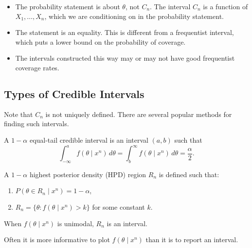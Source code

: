 \begin{itemize}
    \item The probability statement is about $\theta$, not $C_n$. The interval
    $C_n$ is a function of $X_1, \dots, X_n$, which we are conditioning on in
    the probability statement.
    \item The statement is an equality. This is different from a frequentist
    interval, which puts a lower bound on the probability of coverage.
    \item The intervals constructed this way may or may not have good
    frequentist coverage rates.
\end{itemize}


\subsection{Types of Credible Intervals}

Note that $C_n$ is not uniquely defined. There are several popular methods for
finding such intervals.

A $1-\alpha$ equal-tail credible interval is an interval $(a,b)$ such that
\[
\int_{-\infty}^{a} f(\theta \mid x^n)\, d\theta
=
\int_{b}^{\infty} f(\theta \mid x^n)\, d\theta
=
\frac{\alpha}{2}.
\]

A $1-\alpha$ highest posterior density (HPD) region $R_n$ is defined such that:
\begin{enumerate}
    \item $P(\theta \in R_n \mid x^n) = 1 - \alpha$,
    \item $R_n = \{ \theta : f(\theta \mid x^n) > k \}$ for some constant $k$.
\end{enumerate}

When $f(\theta \mid x^n)$ is unimodal, $R_n$ is an interval.

Often it is more informative to plot $f(\theta \mid x^n)$ than it is to report
an interval.
